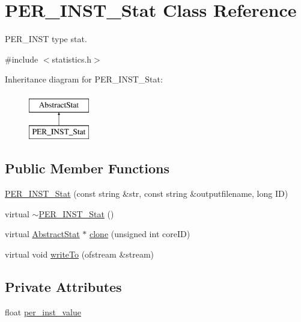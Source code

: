 \hypertarget{classPER__INST__Stat}{
\section{PER\_\-INST\_\-Stat Class Reference}
\label{classPER__INST__Stat}
}


PER\_\-INST type stat.  




{\ttfamily \#include $<$statistics.h$>$}

Inheritance diagram for PER\_\-INST\_\-Stat:\begin{figure}[H]
\begin{center}
\leavevmode
\includegraphics[height=2.000000cm]{classPER__INST__Stat}
\end{center}
\end{figure}
\subsection*{Public Member Functions}
\begin{DoxyCompactItemize}
\item 
\hyperlink{classPER__INST__Stat_aabfaf17917f7d000cca7a88baba533a4}{PER\_\-INST\_\-Stat} (const string \&str, const string \&outputfilename, long ID)
\item 
virtual \hyperlink{classPER__INST__Stat_a6f3a65cdcd74729016d755bfed571a6c}{$\sim$PER\_\-INST\_\-Stat} ()
\item 
virtual \hyperlink{classAbstractStat}{AbstractStat} $\ast$ \hyperlink{classPER__INST__Stat_a46a249720fb40d3ddef0c2f39c241c03}{clone} (unsigned int coreID)
\item 
virtual void \hyperlink{classPER__INST__Stat_ad7ffab56cc4bbd33c3332de3863e9b54}{writeTo} (ofstream \&stream)
\end{DoxyCompactItemize}
\subsection*{Private Attributes}
\begin{DoxyCompactItemize}
\item 
float \hyperlink{classPER__INST__Stat_a1678ba031f3e53cdca033aac3e352925}{per\_\-inst\_\-value}
\end{DoxyCompactItemize}


